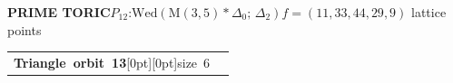 \documentclass[14pt]{extarticle}
\makeatletter
\newcommand{\AtlasSupportOrbitSplit}[2]{%
  \begin{tabularx}{\linewidth}[t]{%
    @{}>{\raggedright\arraybackslash}p{.37\linewidth}%
    @{\hspace{2.5mm}\AtlasOrbitDivider\hspace{2.5mm}}%
    >{\raggedright\arraybackslash}X@{}}%
    \begin{minipage}[t]{\linewidth}\vspace{0pt}#1\end{minipage} &
    \begin{minipage}[t]{\linewidth}\vspace{0pt}#2\end{minipage}
  \end{tabularx}}
\makeatother
\begin{document}
\begin{atlasbox}\begin{atlaspanel}
\textcolor{toricgreen}{\bfseries PRIME TORIC}\quad \(P_{12}\):\enspace \(\mathrm{Wed}(\mathrm{M}(3,5)\ast\Delta_{0};\,\Delta_2)\)\quad \(f=(11,33,44,29,9)\) lattice points
\end{atlaspanel}\end{atlasbox}
\clearpage
\begin{atlaspanel}[top=1mm,bottom=2mm]
\AtlasSupportOrbitSplit{%
\vspace*{-3mm}\mbox{{\LARGE\bfseries Triangle orbit 13}\hspace{3mm}\raisebox{.8mm}[0pt][0pt]{{\fontsize{16}{18}\selectfont\color{muted}size 6}}}%
}{%
\vspace*{-3mm}{\fontsize{13}{16}\selectfont{\color{muted}\(\mathbb{Q}\) and \(\mathbb{F}_2\)}\quad{\color{muted}\(\underline{\{8,\,9,\,37\}}\), \(\{8,\,10,\,37\}\), \(\{9,\,33,\,37\}\), \(\{30,\,33,\,37\}\), \(\{10,\,34,\,37\}\), \(\{30,\,34,\,37\}\)}\rule[-3mm]{0pt}{3mm}}%
}%
\end{atlaspanel}\vspace{2mm}
\end{document}

